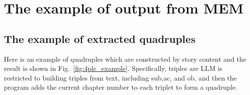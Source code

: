 \section{The example of output from MEM }
\label{sup:mem example}
\subsection{The example of extracted quadruples}
\label{sup:quadruples example}

Here is an example of quadruples which are constructed by story content and the result is shown in Fig.~\ref{fig:4ple_example}. Specifically, triples are
LLM is restricted to building triples from text, including sub,ac, and ob, and then the program adds the current chapter number to each triplet to form a quadruple. 

